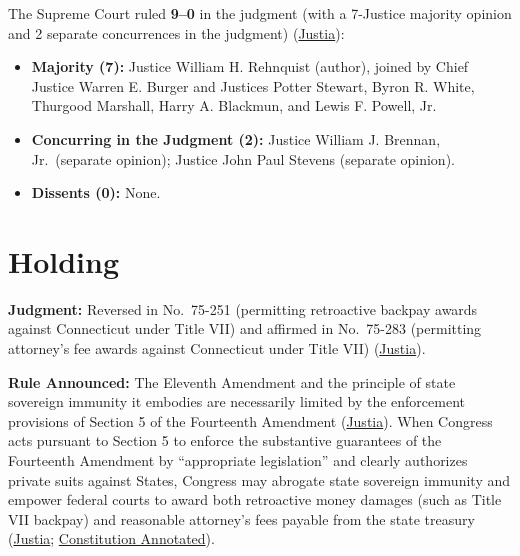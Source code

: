 \documentclass[12pt]{article}
\begin{document}
The Supreme Court ruled \textbf{9--0} in the judgment (with a 7-Justice majority opinion and 2 separate concurrences in the judgment) (\href{https://supreme.justia.com/cases/federal/us/427/445/}{Justia}):

\begin{itemize}
\item \textbf{Majority (7):} Justice William H. Rehnquist (author), joined by Chief Justice Warren E. Burger and Justices Potter Stewart, Byron R. White, Thurgood Marshall, Harry A. Blackmun, and Lewis F. Powell, Jr.
\item \textbf{Concurring in the Judgment (2):} Justice William J. Brennan, Jr.\ (separate opinion); Justice John Paul Stevens (separate opinion).
\item \textbf{Dissents (0):} None.
\end{itemize}

\section{Holding}

\textbf{Judgment:} Reversed in No.\ 75-251 (permitting retroactive backpay awards against Connecticut under Title VII) and affirmed in No.\ 75-283 (permitting attorney's fee awards against Connecticut under Title VII) (\href{https://supreme.justia.com/cases/federal/us/427/445/}{Justia}).

\textbf{Rule Announced:} The Eleventh Amendment and the principle of state sovereign immunity it embodies are necessarily limited by the enforcement provisions of Section 5 of the Fourteenth Amendment (\href{https://supreme.justia.com/cases/federal/us/427/445/}{Justia}). When Congress acts pursuant to Section 5 to enforce the substantive guarantees of the Fourteenth Amendment by ``appropriate legislation'' and clearly authorizes private suits against States, Congress may abrogate state sovereign immunity and empower federal courts to award both retroactive money damages (such as Title VII backpay) and reasonable attorney's fees payable from the state treasury (\href{https://supreme.justia.com/cases/federal/us/427/445/}{Justia}; \href{https://constitution.congress.gov/browse/essay/amdt11-6-2/ALDE_00013683/}{Constitution Annotated}).
\end{document}
